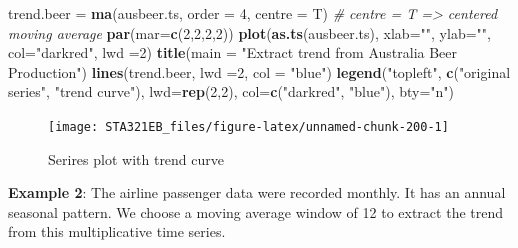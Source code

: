\documentclass[
]{book}
\newenvironment{Shaded}{\begin{snugshade}}{\end{snugshade}}
\newcommand{\AttributeTok}[1]{\textcolor[rgb]{0.13,0.29,0.53}{#1}}
\newcommand{\CommentTok}[1]{\textcolor[rgb]{0.56,0.35,0.01}{\textit{#1}}}
\newcommand{\DecValTok}[1]{\textcolor[rgb]{0.00,0.00,0.81}{#1}}
\newcommand{\FunctionTok}[1]{\textcolor[rgb]{0.13,0.29,0.53}{\textbf{#1}}}
\newcommand{\NormalTok}[1]{#1}
\newcommand{\OtherTok}[1]{\textcolor[rgb]{0.56,0.35,0.01}{#1}}
\newcommand{\StringTok}[1]{\textcolor[rgb]{0.31,0.60,0.02}{#1}}
\begin{document}
\begin{Shaded}
\begin{Highlighting}[]
\NormalTok{trend.beer }\OtherTok{=} \FunctionTok{ma}\NormalTok{(ausbeer.ts, }\AttributeTok{order =} \DecValTok{4}\NormalTok{, }\AttributeTok{centre =}\NormalTok{ T)  }\CommentTok{\# centre = T =\textgreater{} centered moving average}
\FunctionTok{par}\NormalTok{(}\AttributeTok{mar=}\FunctionTok{c}\NormalTok{(}\DecValTok{2}\NormalTok{,}\DecValTok{2}\NormalTok{,}\DecValTok{2}\NormalTok{,}\DecValTok{2}\NormalTok{))}
\FunctionTok{plot}\NormalTok{(}\FunctionTok{as.ts}\NormalTok{(ausbeer.ts), }\AttributeTok{xlab=}\StringTok{""}\NormalTok{, }\AttributeTok{ylab=}\StringTok{""}\NormalTok{, }\AttributeTok{col=}\StringTok{"darkred"}\NormalTok{, }\AttributeTok{lwd =}\DecValTok{2}\NormalTok{)}
\FunctionTok{title}\NormalTok{(}\AttributeTok{main =} \StringTok{"Extract trend from Australia Beer Production"}\NormalTok{)}
\FunctionTok{lines}\NormalTok{(trend.beer, }\AttributeTok{lwd =}\DecValTok{2}\NormalTok{, }\AttributeTok{col =} \StringTok{"blue"}\NormalTok{)}
\FunctionTok{legend}\NormalTok{(}\StringTok{"topleft"}\NormalTok{, }\FunctionTok{c}\NormalTok{(}\StringTok{"original series"}\NormalTok{, }\StringTok{"trend curve"}\NormalTok{), }\AttributeTok{lwd=}\FunctionTok{rep}\NormalTok{(}\DecValTok{2}\NormalTok{,}\DecValTok{2}\NormalTok{),}
       \AttributeTok{col=}\FunctionTok{c}\NormalTok{(}\StringTok{"darkred"}\NormalTok{, }\StringTok{"blue"}\NormalTok{), }\AttributeTok{bty=}\StringTok{"n"}\NormalTok{)}
\end{Highlighting}
\end{Shaded}

\begin{figure}

{\centering \texttt{[image: STA321EB\_files/figure-latex/unnamed-chunk-200-1]} 

}

\caption{Serires plot with trend curve}\label{fig:unnamed-chunk-200}
\end{figure}

\textbf{Example 2}: The airline passenger data were recorded monthly. It has an annual seasonal pattern. We choose a moving average window of 12 to extract the trend from this multiplicative time series.
\end{document}
